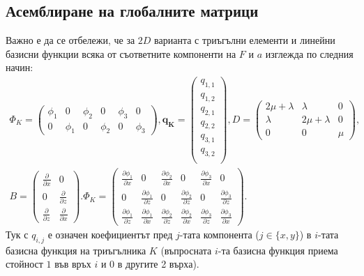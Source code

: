 \documentclass{report}
\begin{document}
	\subsection{Асемблиране на глобалните матрици}
	Важно е да се отбележи, че за $2D$ варианта с триъгълни елементи и линейни базисни функции всяка от съответните компоненти на $F$ и $a$ изглежда по следния начин:
	\begin{align*}
		\Phi_K = 
		\begin{pmatrix}
			\phi_1 & 0 & \phi_2 & 0 & \phi_3 & 0\\
			0 & \phi_1 & 0 & \phi_2 & 0 & \phi_3
		\end{pmatrix},
		\mathbf{q_K} = 
		\begin{pmatrix}
			q_{1,1}\\
			q_{1,2}\\
			q_{2,1}\\
			q_{2,2}\\
			q_{3,1}\\
			q_{3,2}\\
		\end{pmatrix},
		D=\begin{pmatrix}
			2\mu+\lambda & \lambda & 0\\
			\lambda & 2\mu+\lambda & 0\\
			0 & 0 & \mu
		\end{pmatrix},\\
		B=\begin{pmatrix}
			\frac{\partial}{\partial x} & 0\\
			0 & \frac{\partial}{\partial z}\\
			\frac{\partial}{\partial z} & \frac{\partial}{\partial x}
		\end{pmatrix}.\Phi_K = 
		\begin{pmatrix}
			\frac{\partial \phi_1}{\partial x} & 0 & \frac{\partial \phi_2}{\partial x} & 0 & \frac{\partial \phi_3}{\partial x} & 0\\
			0 & \frac{\partial \phi_1}{\partial z} & 0 & \frac{\partial \phi_2}{\partial z} & 0 & \frac{\partial \phi_3}{\partial z}\\
			\frac{\partial \phi_1}{\partial z} & \frac{\partial \phi_1}{\partial x} & \frac{\partial \phi_2}{\partial z} & \frac{\partial \phi_2}{\partial x} & 
			\frac{\partial \phi_3}{\partial z} & \frac{\partial \phi_3}{\partial x} 
		\end{pmatrix}.
	\end{align*}
	Тук с $q_{i,j}$ е означен коефициентът пред $j$-тата компонента ($j \in \{ x,y\}$) в $i$-тата базисна функция на триъгълника $K$ (въпросната $i$-та базисна функция приема стойност $1$ във връх $i$ и $0$ в другите 2 върха).
	
\end{document}
